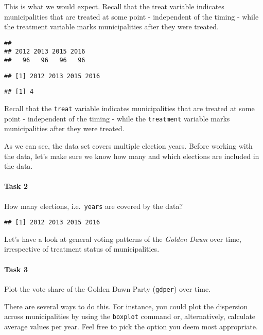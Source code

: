 \documentclass[
]{article}
\begin{document}
This is what we would expect. Recall that the treat variable indicates
municipalities that are treated at some point - independent of the
timing - while the treatment variable marks municipalities after they
were treated.

\begin{verbatim}
## 
## 2012 2013 2015 2016 
##   96   96   96   96
\end{verbatim}

\begin{verbatim}
## [1] 2012 2013 2015 2016
\end{verbatim}

\begin{verbatim}
## [1] 4
\end{verbatim}

Recall that the \texttt{treat} variable indicates municipalities that
are treated at some point - independent of the timing - while the
\texttt{treatment} variable marks municipalities after they were
treated.

As we can see, the data set covers multiple election years. Before
working with the data, let's make sure we know how many and which
elections are included in the data.

\paragraph{Task 2}\label{task-2}

How many elections, i.e.~\texttt{years} are covered by the data?

\begin{verbatim}
## [1] 2012 2013 2015 2016
\end{verbatim}

Let's have a look at general voting patterns of the \emph{Golden Dawn}
over time, irrespective of treatment status of municipalities.

\paragraph{Task 3}\label{task-3}

Plot the vote share of the Golden Dawn Party (\texttt{gdper}) over time.

There are several ways to do this. For instance, you could plot the
dispersion across municipalities by using the \texttt{boxplot} command
or, alternatively, calculate average values per year. Feel free to pick
the option you deem most appropriate.
\end{document}
